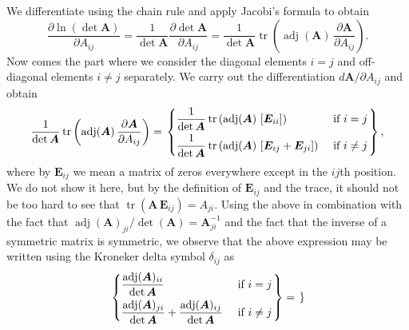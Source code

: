 \documentclass[12pt, a4paper]{article}
\newcommand{\vect}[1]{\bm{#1}}
\begin{document}
{\begin{easylist}[enumerate]
We differentiate using the chain rule and apply Jacobi's formula to obtain
\begin{equation*}
	\frac{\partial \ln \left( \det \vect{A} \right)}{\partial A_{ij}}
	=
	\frac{1}{\det \vect{A}}
	\frac{\partial \det \vect{A} }{\partial A_{ij}}
	=
	\frac{1}{\det \vect{A}}
	\operatorname{tr} \left(  \operatorname{adj}(\vect{A}) \, \frac{\partial \vect{A}}{\partial A_{ij}} \right).
\end{equation*}
Now comes the part where we consider the diagonal elements $i=j$ and off-diagonal elements $i \neq j$ separately.
We carry out the differentiation $d\vect{A} / \partial A_{ij}$ and obtain
\begin{equation*}
\frac{1}{\det \vect{A}}
\operatorname{tr} \left(  \operatorname{adj}(\vect{A}) \, \frac{\partial \vect{A}}{\partial A_{ij}} \right)
=
\begin{rcases}
\begin{dcases}
\frac{1}{\det \vect{A}}
\operatorname{tr} \left(  \operatorname{adj}(\vect{A}) \, \left[  \vect{E}_{ii} \right] \right) & \text{ if } i = j \\
\frac{1}{\det \vect{A}}
\operatorname{tr} \left(  \operatorname{adj}(\vect{A}) \, \left[  \vect{E}_{ij} + \vect{E}_{ji} \right] \right) & \text{ if } i \neq j
\end{dcases}
\end{rcases},
\end{equation*}
where by $\vect{E}_{ij}$ we mean a matrix of zeros everywhere except in the $ij$th position.
We do not show it here, but by the definition of $\vect{E}_{ij}$ and the trace, it should not be too hard to see that $\operatorname{tr} \left(  \vect{A} \,  \vect{E}_{ij}  \right) = A_{ji}$.
Using the above in combination with the fact that $\operatorname{adj}(\vect{A})_{ji} / \det (\vect{A}) = \vect{A}^{-1}_{ji}$ and the fact that the inverse of a symmetric matrix is symmetric, we observe that the above expression may be written using the Kroneker delta symbol $\delta_{ij}$ as
\begin{equation*}
\begin{rcases}
\begin{dcases}
\frac{\operatorname{adj}(\vect{A})_{ii}}{\det \vect{A}}
    & \text{ if } i = j \\
\frac{\operatorname{adj}(\vect{A})_{ji}}{\det \vect{A}}
 +
 \frac{\operatorname{adj}(\vect{A})_{ij}}{\det \vect{A}}  & \text{ if } i \neq j
\end{dcases}
\end{rcases}
=
\begin{rcases}

\end{rcases}
\end{equation*}
\end{easylist}}
\end{document}
